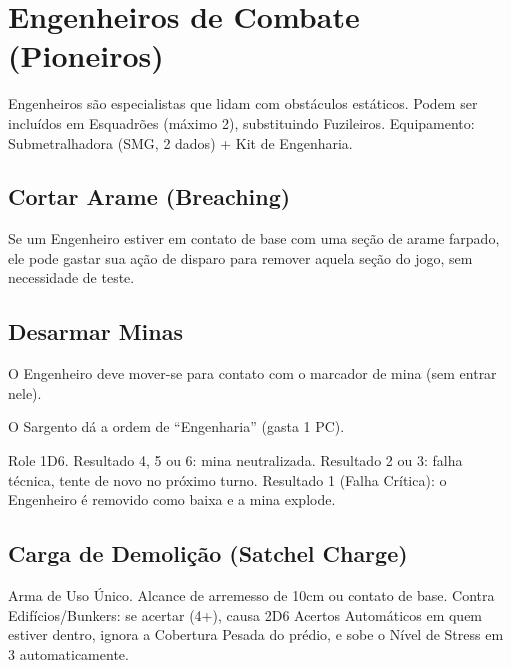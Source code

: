 \section{Engenheiros de Combate (Pioneiros)}

Engenheiros são especialistas que lidam com obstáculos estáticos. Podem ser incluídos em Esquadrões (máximo 2), substituindo Fuzileiros. Equipamento: Submetralhadora (SMG, 2 dados) + Kit de Engenharia.

\subsection{Cortar Arame (Breaching)}

Se um Engenheiro estiver em contato de base com uma seção de arame farpado, ele pode gastar sua ação de disparo para remover aquela seção do jogo, sem necessidade de teste.

\subsection{Desarmar Minas}

O Engenheiro deve mover-se para contato com o marcador de mina (sem entrar nele).

O Sargento dá a ordem de ``Engenharia'' (gasta 1 PC).

Role 1D6. Resultado 4, 5 ou 6: mina neutralizada. Resultado 2 ou 3: falha técnica, tente de novo no próximo turno. Resultado 1 (Falha Crítica): o Engenheiro é removido como baixa e a mina explode.

\subsection{Carga de Demolição (Satchel Charge)}

Arma de Uso Único. Alcance de arremesso de 10cm ou contato de base. Contra Edifícios/Bunkers: se acertar (4+), causa 2D6 Acertos Automáticos em quem estiver dentro, ignora a Cobertura Pesada do prédio, e sobe o Nível de Stress em 3 automaticamente.
